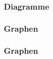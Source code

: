 \begin{frame}
\frametitle{Diagramme}
	
\end{frame}

\begin{frame}
\frametitle{Graphen}
\begin{figure}[!h]

\end{figure}
\end{frame}

\begin{frame}
\frametitle{Graphen}
	
\end{frame}

